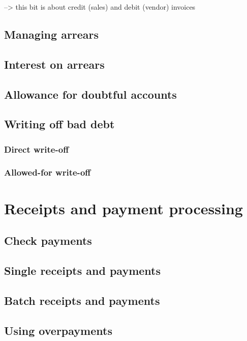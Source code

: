 \documentclass[10pt,A4]{book}
\begin{document}
--> this bit is about credit (sales) and debit (vendor) invoices

\section{Managing arrears}

\section{Interest on arrears}

\section{Allowance for doubtful accounts}

\section{Writing off bad debt}

\subsection{Direct write-off}

\subsection{Allowed-for write-off}


\chapter{Receipts and payment processing}

\section{Check payments}

\section{Single receipts and payments}

\section{Batch receipts and payments}

\section{Using overpayments}
\label{sec:UsingOverpayments}
\end{document}
